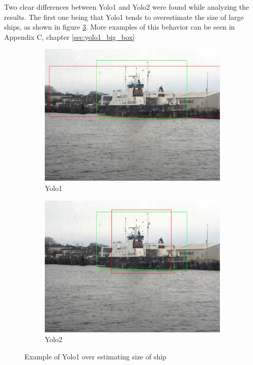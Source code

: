 \vspace{3mm}

Two clear differences between Yolo1 and Yolo2 were found while analyzing the results. The first one being that Yolo1 tends to overestimate the size of large ships, as shown in figure \ref{fig:yolo12_big}. More examples of this behavior can be seen in Appendix C, chapter \ref{sec:yolo1_big_box}

\begin{figure}[h!]
\begin{subfigure}{.5\textwidth}
  \centering
  \includegraphics[width=0.8\linewidth]{results/case_tr_moor/yolo12/yolo1/big/IMG_2566.jpg}
  \caption{Yolo1}
  \label{fig:yolo1_big}
\end{subfigure}%
\begin{subfigure}{.5\textwidth}
  \centering
  \includegraphics[width=.8\linewidth]{results/case_tr_moor/yolo12/yolo2/big/IMG_2566.jpg}
  \caption{Yolo2}
  \label{fig:yolo2_big}
\end{subfigure}
\caption{Example of Yolo1 over estimating size of ship}
\label{fig:yolo12_big}
\end{figure}

